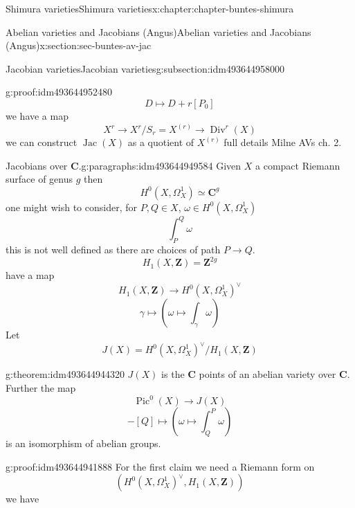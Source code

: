 \documentclass[oneside,10pt,]{book}
\numberwithin{equation}{section}
\newcommand{\ZZ}{\mathbf{Z}}
\newcommand{\CC}{\mathbf{C}}
\DeclareMathOperator{\divisors}{Div}
\DeclareMathOperator{\Pic}{Pic}
\DeclareMathOperator{\Jac}{Jac}
\begin{document}
\begin{chapterptx}{Shimura varieties}{}{Shimura varieties}{}{}{x:chapter:chapter-buntes-shimura}
\begin{sectionptx}{Abelian varieties and Jacobians (Angus)}{}{Abelian varieties and Jacobians (Angus)}{}{}{x:section:sec-buntes-av-jac}
\begin{subsectionptx}{Jacobian varieties}{}{Jacobian varieties}{}{}{g:subsection:idm493644958000}
\begin{proofptx}{}{g:proof:idm493644952480}
%
\begin{equation*}
D \mapsto D + r[P_0]
\end{equation*}
we have  a map%
\begin{equation*}
X^r \to X^r/ S_r = X^{(r)} \to \divisors^r(X)
\end{equation*}
we can construct \(\Jac(X)\) as a quotient of \(X^{(r)}\) full details Milne AVs ch. 2.%
\end{proofptx}
\begin{paragraphs}{Jacobians over \(\CC\).}{g:paragraphs:idm493644949584}%
Given \(X\) a compact Riemann surface of genus \(g\) then%
\begin{equation*}
H^0(X, \Omega_X^1) \simeq \CC^g
\end{equation*}
one might wish to consider, for \(P,Q \in X\), \(\omega\in H^0(X, \Omega_X^1)\)%
\begin{equation*}
\int_P^Q \omega
\end{equation*}
this is not well defined as there are choices of path \(P\to Q\).%
\begin{equation*}
H_1(X,\ZZ) = \ZZ^{2g}
\end{equation*}
have  a map%
\begin{equation*}
H_1(X,\ZZ) \to H^0(X, \Omega_X^1) ^\vee
\end{equation*}
%
\begin{equation*}
\gamma \mapsto (\omega \mapsto \int_\gamma \omega)
\end{equation*}
Let%
\begin{equation*}
J(X) = H^0(X, \Omega_X^1) ^\vee/H_1(X,\ZZ)
\end{equation*}
%
\begin{theorem}{}{}{g:theorem:idm493644944320}%
\(J(X) \) is the \(\CC\) points of an abelian variety over \(\CC\). Further the map%
\begin{equation*}
\Pic^0(X) \to J(X)
\end{equation*}
%
\begin{equation*}
[P] - [Q] \mapsto (\omega \mapsto \int^P_Q \omega)
\end{equation*}
is an isomorphism of abelian groups.%
\end{theorem}
\begin{proofptx}{}{g:proof:idm493644941888}
For the first claim we need a Riemann form on%
\begin{equation*}
(H^0(X, \Omega_X^1)^\vee , H_1(X,\ZZ))
\end{equation*}
we have%
\begin{equation*}

\end{equation*}
\end{proofptx}
\end{paragraphs}
\end{subsectionptx}
\end{sectionptx}
\end{chapterptx}
\end{document}
